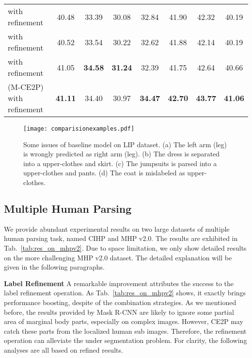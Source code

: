 \documentclass[letterpaper]{article} \usepackage{formatting-instructions-latex-2019}  \usepackage{times}  \usepackage{helvet}  \usepackage{courier}  \usepackage{url}  \usepackage{graphicx}  \frenchspacing  \setlength{\pdfpagewidth}{8.5in}  \setlength{\pdfpageheight}{11in}
\begin{document}
\begin{table*}[t]
\begin{center}
\begin{tabular}{lccccccc}
            
             with refinement            & 40.48          & 33.39          & 30.08          & 32.84          & 41.90          & 42.32          & 40.19          \\
             with refinement              & 40.52          & 33.54          & 30.22          & 32.62          & 41.88          & 42.14          & 40.19          \\
             with refinement           & 41.05          & \textbf{34.58} & \textbf{31.24} & 32.39          & 41.75          & 42.64          & 40.66          \\
            (M-CE2P) with refinement         & \textbf{41.11} & 34.40          & 30.97          & \textbf{34.47} & \textbf{42.70} & \textbf{43.77} & \textbf{41.06} \\ 
\bottomrule
        \end{tabular} 
    \end{center}
\end{table*}


\begin{figure}[t]
   \centering
     \texttt{[image: comparisionexamples.pdf]}
     \caption{Some issues of baseline model on LIP dataset. (a) The left arm (leg) is wrongly predicted as right arm (leg). (b) The dress is separated into a upper-clothes and skirt. (c) The jumpsuits is parsed into a upper-clothes and pants. (d) The coat is mislabeled as upper-clothes.   }
     \label{fig:comparision}
\end{figure}

\subsection{Multiple Human Parsing}
We provide abundant experimental results on two large datasets of multiple human parsing task, named CIHP and MHP v2.0. 
The results are exhibited in Tab.~\ref{tab:res_on_mhpv2}. Due to space limitation, we only show detailed results on the more challenging MHP v2.0 dataset. The detailed explanation will be given in the following paragraphs.

\noindent \textbf{Label Refinement}
A remarkable improvement attributes the success to the label refinement operation. As Tab.~\ref{tab:res_on_mhpv2} shows, it exactly brings performance boosting, despite of the combination strategies. As we mentioned before, the results provided by Mask R-CNN are likely to ignore some partial area of marginal body parts, especially on complex images. However, CE2P may catch these parts from the localized human sub images. Therefore, the refinement operation can alleviate the under segmentation problem. For clarity, the following analyses are all based on refined results.
\end{document}
